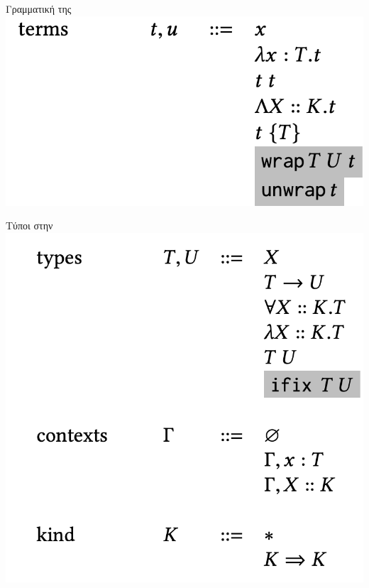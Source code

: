 \documentclass[10pt]{beamer}
\begin{document}
\begin{frame}{Γραμματική της \FOMF}
\includegraphics[scale=0.5]{images/terms.png}
\end{frame}

\begin{frame}{Τύποι στην \FOMF}
\includegraphics[scale=0.5]{images/types.png}
\end{frame}
\end{document}
